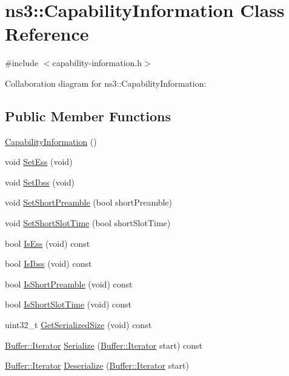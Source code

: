 \hypertarget{classns3_1_1CapabilityInformation}{}\section{ns3\+:\+:Capability\+Information Class Reference}
\label{classns3_1_1CapabilityInformation}


{\ttfamily \#include $<$capability-\/information.\+h$>$}



Collaboration diagram for ns3\+:\+:Capability\+Information\+:
\subsection*{Public Member Functions}
\begin{DoxyCompactItemize}
\item 
\hyperlink{classns3_1_1CapabilityInformation_a47882239d28a0e2eaf4e2783ca36f644}{Capability\+Information} ()
\item 
void \hyperlink{classns3_1_1CapabilityInformation_acd61983d39d0f8504c6511b08bcede9d}{Set\+Ess} (void)
\item 
void \hyperlink{classns3_1_1CapabilityInformation_a470bd7456c7a0c2de4dac39407a86d3b}{Set\+Ibss} (void)
\item 
void \hyperlink{classns3_1_1CapabilityInformation_acd5df84b6cb8f81e2b6d0d689e987a18}{Set\+Short\+Preamble} (bool short\+Preamble)
\item 
void \hyperlink{classns3_1_1CapabilityInformation_a914df2876c09377877259ccc9d422626}{Set\+Short\+Slot\+Time} (bool short\+Slot\+Time)
\item 
bool \hyperlink{classns3_1_1CapabilityInformation_a74c47cffb884cd1d8b52635b79f6bb58}{Is\+Ess} (void) const 
\item 
bool \hyperlink{classns3_1_1CapabilityInformation_adb536d75cd0c297c23077fc3d61752de}{Is\+Ibss} (void) const 
\item 
bool \hyperlink{classns3_1_1CapabilityInformation_aa053af43bdd3a0e2965916f0de40e05c}{Is\+Short\+Preamble} (void) const 
\item 
bool \hyperlink{classns3_1_1CapabilityInformation_aba16c3e23889f82864eadba1256ae30c}{Is\+Short\+Slot\+Time} (void) const 
\item 
uint32\+\_\+t \hyperlink{classns3_1_1CapabilityInformation_aa7e8c7085308f576e64b5a4c93898a73}{Get\+Serialized\+Size} (void) const 
\item 
\hyperlink{classns3_1_1Buffer_1_1Iterator}{Buffer\+::\+Iterator} \hyperlink{classns3_1_1CapabilityInformation_ae2671dc343fe7d7a756ef5915f2f6aa8}{Serialize} (\hyperlink{classns3_1_1Buffer_1_1Iterator}{Buffer\+::\+Iterator} start) const 
\item 
\hyperlink{classns3_1_1Buffer_1_1Iterator}{Buffer\+::\+Iterator} \hyperlink{classns3_1_1CapabilityInformation_adcf6366b469c428eb21eb25994111cb8}{Deserialize} (\hyperlink{classns3_1_1Buffer_1_1Iterator}{Buffer\+::\+Iterator} start)
\end{DoxyCompactItemize}
